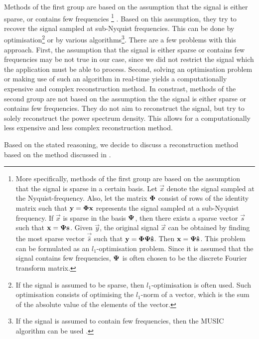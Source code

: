 \documentclass[a4paper, openany, oneside]{memoir}
\begin{document}
Methods of the first group are based on the assumption that the signal is either sparse, or contains few frequencies%
\footnote{More specifically, methods of the first group are based on the assumption that the signal is sparse in a certain basis. Let $\vec{x}$ denote the signal sampled at the Nyquist-frequency. Also, let the matrix $\boldsymbol{\mathbf{\Phi}}$ consist of rows of the identity matrix such that $\boldsymbol{\mathbf{y}}=\boldsymbol{\mathbf{\Phi}}\boldsymbol{\mathbf{x}}$ represents the signal sampled at a sub-Nyquist frequency. If $\vec{x}$ is sparse in the basis $\boldsymbol{\mathbf{\Psi}}$, then there exists a sparse vector $\vec{s}$ such that $\boldsymbol{\mathbf{x}}=\boldsymbol{\mathbf{\Psi}}\boldsymbol{\mathbf{s}}$. Given $\vec{y}$, the original signal $\vec{x}$ can be obtained by finding the most sparse vector $\vec{\hat{s}}$ such that $\boldsymbol{\mathbf{y}}=\boldsymbol{\mathbf{\Phi}}\boldsymbol{\mathbf{\Psi}}\boldsymbol{\mathbf{\hat{s}}}$. Then $\boldsymbol{\mathbf{x}} = \boldsymbol{\mathbf{\Psi}}\boldsymbol{\mathbf{\hat{s}}}$. This problem can be formulated as an $l_1$-optimisation problem. Since it is assumed that the signal contains few frequencies, $\boldsymbol{\mathbf{\Psi}}$ is often chosen to be the discrete Fourier transform matrix.}%
. Based on this assumption, they try to recover the signal sampled at sub-Nyquist frequencies. This can be done by optimisation\footnote{If the signal is assumed to be sparse, then $l_1$-optimisation is often used. Such optimisation consists of optimising the $l_1$-norm of a vector, which is the sum of the absolute value of the elements of the vector.} or by various algorithms\footnote{If the signal is assumed to contain few frequencies, then the MUSIC algorithm can be used \cite{pal2011coprime}.}. There are a few problems with this approach. First, the assumption that the signal is either sparse or contains few frequencies may be not true in our case, since we did not restrict the signal which the application must be able to process. Second, solving an optimisation problem or making use of such an algorithm in real-time yields a computationally expensive and complex reconstruction method. In constrast, methods of the second group are not based on the assumption the the signal is either sparse or contains few frequencies. They do not aim to reconstruct the signal, but try to solely reconstruct the power spectrum density. This allows for a computationally less expensive and less complex reconstruction method. 

Based on the stated reasoning, we decide to discuss a reconstruction method based on the method discussed in \cite{ariananda2012compressive}.
\end{document}
